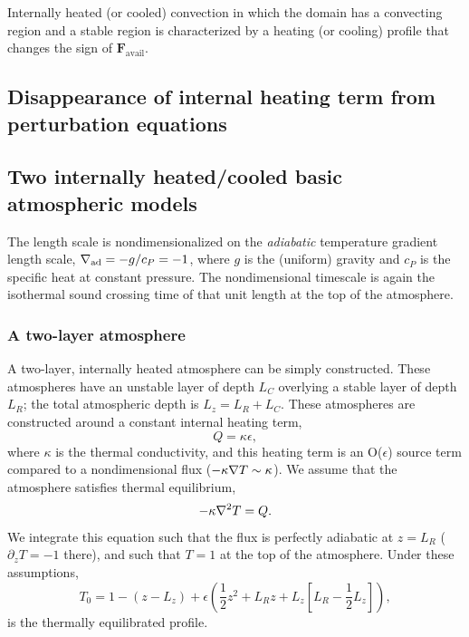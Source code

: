 Internally heated (or cooled) convection in which the domain has a convecting region and a stable region is characterized by a heating (or cooling) profile that changes the sign of $\bm{F}_{\text{avail}}$.

\subsection{Disappearance of internal heating term from perturbation equations}


\subsection{Two internally heated/cooled basic atmospheric models}
\label{sec:atmospheres}
The length scale is nondimensionalized on the \emph{adiabatic} temperature gradient length scale, $\nabla_{\text{ad}} = -g/c_P = -1$, where $g$ is the (uniform) gravity and $c_P$ is the specific heat at constant pressure.
The nondimensional timescale is again the isothermal sound crossing time of that unit length at the top of the atmosphere.

\subsubsection{A two-layer atmosphere}
A two-layer, internally heated atmosphere can be simply constructed.
These atmospheres have an unstable layer of depth $L_C$ overlying a stable layer of depth $L_R$; the total atmospheric depth is $L_z = L_R + L_C$.
These atmospheres are constructed around a constant internal heating term,
\begin{equation}
Q = \kappa \epsilon,
\end{equation}
where $\kappa$ is the thermal conductivity, and this heating term is an O($\epsilon$) source term compared to a nondimensional flux ($-\kappa\nabla T \sim \kappa$).
We assume that the atmosphere satisfies thermal equilibrium,
$$
-\kappa \nabla^2 T = Q.
$$
We integrate this equation such that the flux is perfectly adiabatic at $z = L_R$ ($\partial_z T = -1$ there), and such that $T = 1$ at the top of the atmosphere.
Under these assumptions,
\begin{equation}
T_0 = 1 - (z - L_z) + \epsilon\left(\frac{1}{2} z^2 + L_R z + L_z \left[L_R - \frac{1}{2}L_z\right]\right),
\end{equation}
is the thermally equilibrated profile.



